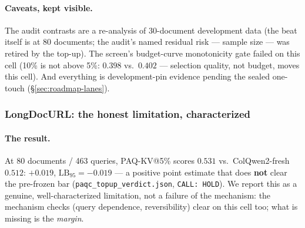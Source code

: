 \documentclass[11pt,letterpaper]{article}
\newcommand{\paqc}{\textsc{PAQ-KV}}
\newcommand{\lb}{\mathrm{LB}_{95}}
\begin{document}
\paragraph{Caveats, kept visible.} The audit contrasts are a re-analysis of 30-document
development data (the beat itself is at 80 documents; the audit's named residual risk ---
sample size --- was retired by the top-up). The screen's budget-curve monotonicity gate failed
on this cell (10\% is not above 5\%: $0.398$ vs.\ $0.402$ --- selection quality, not budget,
moves this cell). And everything is development-pin evidence pending the sealed one-touch
(\S\ref{sec:roadmap-lanes}).

\subsubsection{LongDocURL: the honest limitation, characterized}\label{sec:results-paqkv-long}

\paragraph{The result.} At 80 documents / 463 queries, \paqc{}@5\% scores $0.531$ vs.\
ColQwen2-fresh $0.512$: $+0.019$, $\lb=-0.019$ --- a positive point estimate that does
\textbf{not} clear the pre-frozen bar (\texttt{paqc\_topup\_verdict.json},
\texttt{CALL: HOLD}). We report this as a genuine, well-characterized limitation, not a
failure of the mechanism: the mechanism checks (query dependence, reversibility) clear on this
cell too; what is missing is the \emph{margin}.
\end{document}
